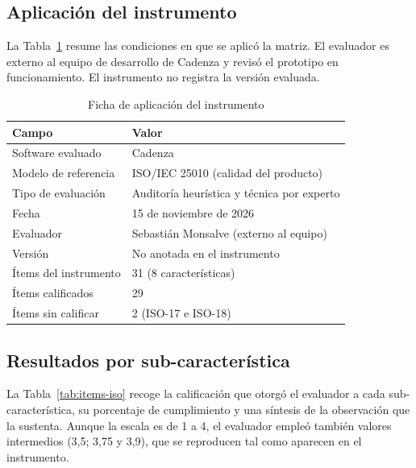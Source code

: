 \documentclass[conference]{IEEEtran}
\begin{document}
\subsection{Aplicación del instrumento}

La Tabla~\ref{tab:ficha-iso} resume las condiciones en que se aplicó la
matriz. El evaluador es externo al equipo de desarrollo de Cadenza y
revisó el prototipo en funcionamiento. El instrumento no registra la
versión evaluada.

\begin{table}[htbp]
\caption{Ficha de aplicación del instrumento}
\label{tab:ficha-iso}
\centering
\footnotesize
\begin{tabular}{|p{2.6cm}|p{4.6cm}|}
\hline
\textbf{Campo} & \textbf{Valor} \\
\hline
Software evaluado & Cadenza \\
\hline
Modelo de referencia & ISO/IEC 25010 (calidad del producto) \\
\hline
Tipo de evaluación & Auditoría heurística y técnica por experto \\
\hline
Fecha & 15 de noviembre de 2026 \\
\hline
Evaluador & Sebastián Monsalve (externo al equipo) \\
\hline
Versión & No anotada en el instrumento \\
\hline
Ítems del instrumento & 31 (8 características) \\
\hline
Ítems calificados & 29 \\
\hline
Ítems sin calificar & 2 (ISO-17 e ISO-18) \\
\hline
\end{tabular}
\end{table}

\subsection{Resultados por sub-característica}

La Tabla~\ref{tab:items-iso} recoge la calificación que otorgó el
evaluador a cada sub-característica, su porcentaje de cumplimiento y una
síntesis de la observación que la sustenta. Aunque la escala es de 1 a 4,
el evaluador empleó también valores intermedios (3,5; 3,75 y 3,9), que se
reproducen tal como aparecen en el instrumento.
\end{document}
